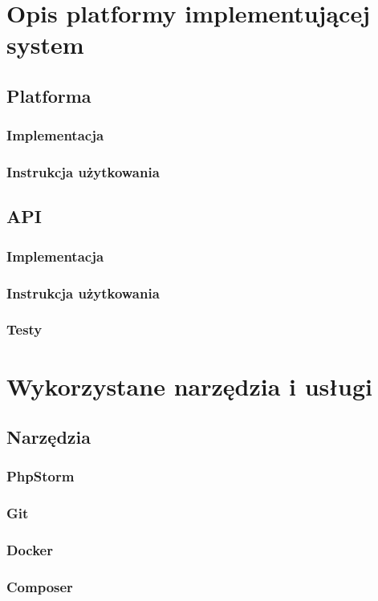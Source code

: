 \documentclass[12pt]{article}
\begin{document}
    \section{Opis platformy implementującej system}
        \subsection{Platforma}
            \subsubsection{Implementacja}
            \subsubsection{Instrukcja użytkowania}
        \subsection{API}
            \subsubsection{Implementacja}
            \subsubsection{Instrukcja użytkowania}
            \subsubsection{Testy}
    \section{Wykorzystane narzędzia i usługi}
        \subsection{Narzędzia}
            \subsubsection{PhpStorm}
            \subsubsection{Git}
            \subsubsection{Docker}
            \subsubsection{Composer}
\end{document}
